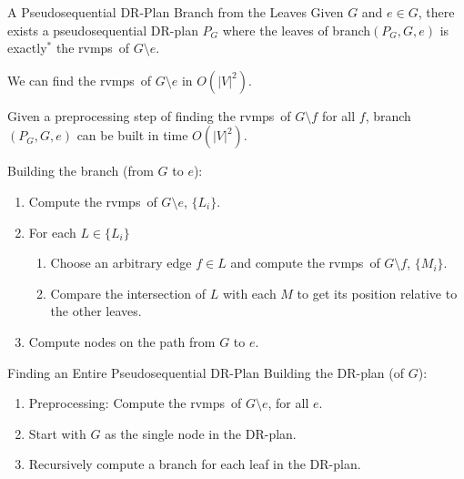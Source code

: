 \documentclass{mySlides}
\newcommand{\n}{\vspace{1em}}
\newcommand{\rvmps}{rvmps}
\begin{document}
\begin{frame}{A Pseudosequential DR-Plan Branch from the Leaves}
    Given $G$ and $e\in G$, there exists a pseudosequential DR-plan $P_G$ where the leaves of branch$(P_G,G,e)$ is exactly$^*$ the \rvmps\ of $G\setminus e$.

    \pause
    \n

    We can find the \rvmps\ of $G\setminus e$ in $O(|V|^2)$.

    \pause
    \n

    Given a preprocessing step of finding the \rvmps\ of $G\setminus f$ for all $f$, branch$(P_G,G,e)$ can be built in time $O(|V|^2)$.

    \pause
    \n

    Building the branch (from $G$ to $e$):
    \begin{enumerate}
        \item Compute the \rvmps\ of $G\setminus e$, $\{L_i\}$.
        \item For each $L\in \{L_i\}$
        \begin{enumerate}
            \item Choose an arbitrary edge $f\in L$ and compute the \rvmps\ of $G\setminus f$, $\{M_i\}$.
            \item Compare the intersection of $L$ with each $M$ to get its position relative to the other leaves.
        \end{enumerate}
        \item Compute nodes on the path from $G$ to $e$.
    \end{enumerate}
\end{frame}

\begin{frame}{Finding an Entire Pseudosequential DR-Plan}
    Building the DR-plan (of $G$):
    \begin{enumerate}
        \item Preprocessing: Compute the \rvmps\ of $G\setminus e$, for all $e$.
        \item Start with $G$ as the single node in the DR-plan.
        \item Recursively compute a branch for each leaf in the DR-plan.
    \end{enumerate}
\end{frame}

\end{document}
